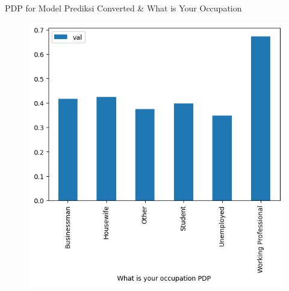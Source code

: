 \documentclass[aspectratio=169]{beamer}
\begin{document}
\begin{frame}{PDP for Model Prediksi Converted \& What is Your Occupation}
	\begin{figure}[!ht]
		\centering
		\includegraphics[scale=.45]{images/pdp-leads-2}
	\end{figure}
\end{frame}
\end{document}
